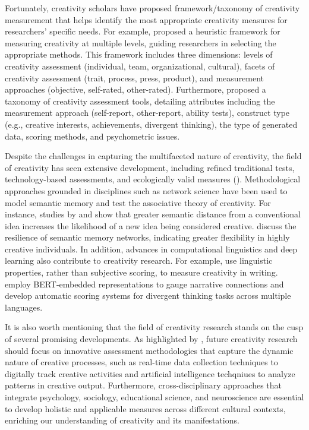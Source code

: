 \documentclass[../MA_Thesis.tex]{subfiles}
\begin{document}
Fortunately, creativity scholars have proposed framework/taxonomy of creativity measurement that helps identify the most appropriate creativity measures for researchers' specific needs. For example, \textcite{batey_measurement_2012} proposed a heuristic framework for measuring creativity at multiple levels, guiding researchers in selecting the appropriate methods. This framework includes three dimensions: levels of creativity assessment (individual, team, organizational, cultural), facets of creativity assessment (trait, process, press, product), and measurement approaches (objective, self-rated, other-rated). Furthermore, \textcite{weiss_improved_2021} proposed a taxonomy of creativity assessment tools, detailing attributes including the measurement approach (self-report, other-report, ability tests), construct type (e.g., creative interests, achievements, divergent thinking), the type of generated data, scoring methods, and psychometric issues.

Despite the challenges in capturing the multifaceted nature of creativity, the field of creativity has seen extensive development, including refined traditional tests, technology-based assessments, and ecologically valid measures (\cite{kaufman_cambridge_2010}). Methodological approaches grounded in disciplines such as network science have been used to model semantic memory and test the associative theory of creativity. For instance, studies by \textcite{kenett_investigating_2014} and \textcite{beaty_forward_2021} show that greater semantic distance from a conventional idea increases the likelihood of a new idea being considered creative. \textcite{kenett_flexibility_2018} discuss the resilience of semantic memory networks, indicating greater flexibility in highly creative individuals. In addition, advances in computational linguistics and deep learning also contribute to creativity research. For example, \textcite{zedelius_beyond_2019} use linguistic properties, rather than subjective scoring, to measure creativity in writing. \textcite{johnson_divergent_2022} employ BERT-embedded representations to gauge narrative connections and \textcite{patterson_multilingual_2023} develop automatic scoring systems for divergent thinking tasks across multiple languages.

It is also worth mentioning that the field of creativity research stands on the cusp of several promising developments. As highlighted by \textcite{kaufman_cambridge_2010}, future creativity research should focus on innovative assessment methodologies that capture the dynamic nature of creative processes, such as real-time data collection techniques to digitally track creative activities and artificial intelligence techqniues to analyze patterns in creative output. Furthermore, cross-disciplinary approaches that integrate psychology, sociology, educational science, and neuroscience are essential to develop holistic and applicable measures across different cultural contexts, enriching our understanding of creativity and its manifestations.
\end{document}
